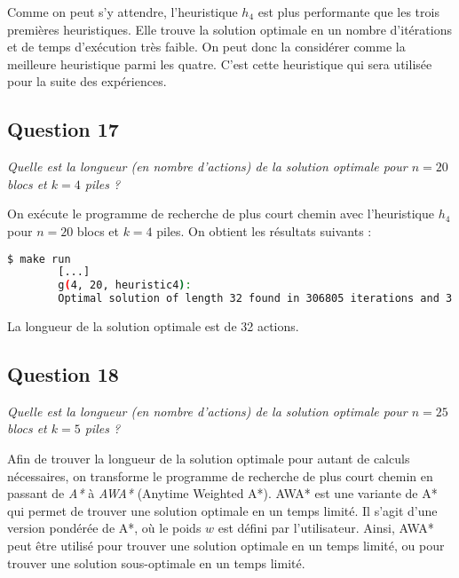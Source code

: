 Comme on peut s'y attendre, l'heuristique $h_4$ est plus performante que les trois premières heuristiques. Elle trouve la solution optimale en un nombre d'itérations et de temps d'exécution très faible. On peut donc la considérer comme la meilleure heuristique parmi les quatre. C'est cette heuristique qui sera utilisée pour la suite des expériences.

\subsection{Question 17}

\textit{Quelle est la longueur (en nombre d'actions) de la solution optimale pour $n = 20$ blocs et $k = 4$ piles ?}

On exécute le programme de recherche de plus court chemin avec l'heuristique $h_4$ pour $n = 20$ blocs et $k = 4$ piles. On obtient les résultats suivants :

\begin{minipage}{\dimexpr\linewidth-20pt}
    \begin{lstlisting}[language=bash, caption={Résultats de l'exécution du programme de recherche de plus court chemin avec l'heuristique $h_4$ pour $k = 4$ piles et $n = 20$ blocs.}, label={lst:plus_court_chemin_results_h4_k4_n20}]
        $ make run
        [...]
        g(4, 20, heuristic4): 
        Optimal solution of length 32 found in 306805 iterations and 3.11438 seconds
    \end{lstlisting}
\end{minipage}

La longueur de la solution optimale est de 32 actions.

\subsection{Question 18}

\textit{Quelle est la longueur (en nombre d'actions) de la solution optimale pour $n = 25$ blocs et $k = 5$ piles ?}

Afin de trouver la longueur de la solution optimale pour autant de calculs nécessaires, on transforme le programme de recherche de plus court chemin en passant de \textit{A*} à \textit{AWA*} (Anytime Weighted A*). AWA* est une variante de A* qui permet de trouver une solution optimale en un temps limité. Il s'agit d'une version pondérée de A*, où le poids $w$ est défini par l'utilisateur. Ainsi, AWA* peut être utilisé pour trouver une solution optimale en un temps limité, ou pour trouver une solution sous-optimale en un temps limité.

